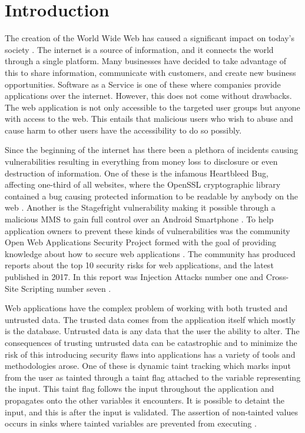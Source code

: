 \chapter{Introduction}
\label{Introduction}

The creation of the World Wide Web has caused a significant impact on today's society \parencite{www}. The internet is a source of information, and it connects the world through a single platform. Many businesses have decided to take advantage of this to share information, communicate with customers, and create new business opportunities. Software as a Service is one of these where companies provide applications over the internet. \parencite{AllenB.2012SAaS, xaas, NewcombeLee2012SaSa} However, this does not come without drawbacks. The web application is not only accessible to the targeted user groups but anyone with access to the web. This entails that malicious users who wish to abuse and cause harm to other users have the accessibility to do so possibly. 

Since the beginning of the internet has there been a plethora of incidents causing vulnerabilities resulting in everything from money loss to disclosure or even destruction of information. One of these is the infamous Heartbleed Bug, affecting one-third of all websites, where the OpenSSL cryptographic library contained a bug causing protected information to be readable by anybody on the web \parencite{Heartbleed}. Another is the Stagefright vulnerability making it possible through a malicious MMS to gain full control over an Android Smartphone \parencite{2015ASvt}. To help application owners to prevent these kinds of vulnerabilities was the community Open Web Applications Security Project formed with the goal of providing knowledge about how to secure web applications \parencite{OpenWebApplicationSecurityProject}. The community has produced reports about the top 10 security risks for web applications, and the latest published in 2017. In this report was Injection Attacks number one and Cross-Site Scripting number seven \parencite{OWASP2017, OpenWebApplicationSecurityProject, CrossMichael2007Dgtw}.

Web applications have the complex problem of working with both trusted and untrusted data. The trusted data comes from the application itself which mostly is the database. Untrusted data is any data that the user the ability to alter. The consequences of trusting untrusted data can be catastrophic and to minimize the risk of this introducing security flaws into applications has a variety of tools and methodologies arose. One of these is dynamic taint tracking which marks input from the user as tainted through a taint flag attached to the variable representing the input. This taint flag follows the input throughout the application and propagates onto the other variables it encounters. It is possible to detaint the input, and this is after the input is validated. The assertion of non-tainted values occurs in sinks where tainted variables are prevented from executing \parencite{Pan2015, Venkataramani2008}. 

